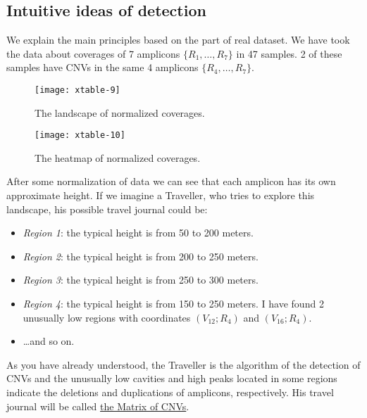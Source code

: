 \documentclass{article}
\begin{document}
\subsection{Intuitive ideas of detection}

We explain the main principles based on the part of real dataset. We have took the data about coverages of 7 amplicons $\{ R_1,\ldots ,R_7 \}$ in 47 samples. 2 of these samples have CNVs in the same 4 amplicons $\{ R_4,\ldots ,R_7 \}$.

\begin{figure}[h]
\begin{center}
\begin{minipage}[h]{0.48\linewidth}
\texttt{[image: xtable-9]}
\caption{The landscape of normalized coverages.} 
\label{ris:experimoriginal} 
\end{minipage}
\hfill 
\begin{minipage}[h]{0.48\linewidth}
\texttt{[image: xtable-10]}
\caption{The heatmap of normalized coverages.}
\label{ris:experimcoded}
\end{minipage}
\end{center}
\end{figure}

After some normalization of data we can see that each amplicon has its own approximate height. If we imagine a Traveller, who tries to explore this landscape, his possible travel journal could be:

\begin{itemize}
\item {\it Region 1}: the typical height is from 50 to 200 meters.

\item {\it Region 2}: the typical height is from 200 to 250 meters.

\item {\it Region 3}: the typical height is from 250 to 300 meters.

\item {\it Region 4}: the typical height is from 150 to 250 meters. I have found 2 unusually low regions with coordinates $(V_{12}; R_4)$ and $(V_{16}; R_4)$.

\item \ldots and so on.

\end{itemize}

As you have already understood, the Traveller is the algorithm of the detection of CNVs and the unusually low cavities and high peaks located in some regions indicate the deletions and duplications of amplicons, respectively. His travel journal will be called \hyperlink{fileWithCNVs}{the Matrix of CNVs}.
\end{document}

